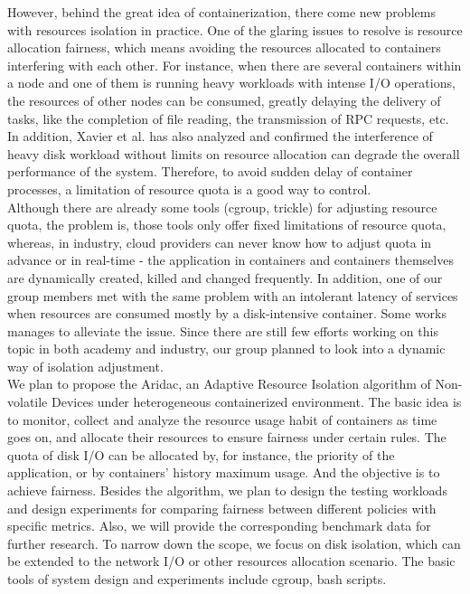 \documentclass[10pt, conference,compsoc]{IEEEtran}
\begin{document}
However, behind the great idea of containerization, there come new problems with resources isolation in practice. One of the glaring issues to resolve is resource allocation fairness, which means avoiding the resources allocated to containers interfering with each other. For instance, when there are several containers within a node and one of them is running heavy workloads with intense I/O operations, the resources of other nodes can be consumed, greatly delaying the delivery of tasks, like the completion of file reading, the transmission of RPC requests, etc. In addition, Xavier et al. \cite{Xavier2015API} has also analyzed and confirmed the interference of heavy disk workload without limits on resource allocation can degrade the overall performance of the system. Therefore, to avoid sudden delay of container processes, a limitation of resource quota is a good way to control.\\

Although there are already some tools (cgroup, trickle) for adjusting resource quota, the problem is, those tools only offer fixed limitations of resource quota, whereas, in industry, cloud providers can never know how to adjust quota in advance or in real-time - the application in containers and containers themselves are dynamically created, killed and changed frequently. In addition, one of our group members met with the same problem with an intolerant latency of services when resources are consumed mostly by a disk-intensive container. Some works \cite{Sungyong16} manages to alleviate the issue. Since there are still few efforts working on this topic in both academy and industry, our group planned to look into a dynamic way of isolation adjustment.\\

We plan to propose the Aridac, an Adaptive Resource Isolation algorithm of Non-volatile Devices under heterogeneous containerized environment. The basic idea is to monitor, collect and analyze the resource usage habit of containers as time goes on, and allocate their resources to ensure fairness under certain rules. The quota of disk I/O can be allocated by, for instance, the priority of the application, or by containers' history maximum usage. And the objective is to achieve fairness. Besides the algorithm, we plan to design the testing workloads and design experiments for comparing fairness between different policies with specific metrics. Also, we will provide the corresponding benchmark data for further research. To narrow down the scope, we focus on disk isolation, which can be extended to the network I/O or other resources allocation scenario. The basic tools of system design and experiments include cgroup, bash scripts.\\
\end{document}
